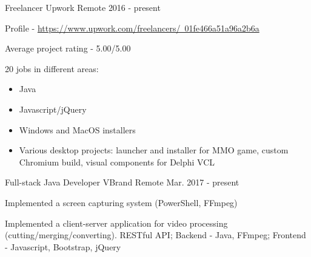 \begin{cventries}
  \cventry
    {Freelancer} %
    {Upwork} %
    {Remote} %
    {2016 - present} %
    {
      \begin{cvitems} %
        \item {Profile - \href{https://www.upwork.com/freelancers/~01fe466a51a96a2b6a}{https://www.upwork.com/freelancers/~01fe466a51a96a2b6a}}
        \item {Average project rating - 5.00/5.00}
        \item {
        	20 jobs in different areas:
            \begin{itemize}
				\item Java
				\item Javascript/jQuery
				\item Windows and MacOS installers
            	\item Various desktop projects: launcher and installer for MMO game, custom Chromium build, visual components for Delphi VCL
			\end{itemize}
        }
      \end{cvitems}
    }

  \cventry
    {Full-stack Java Developer} %
    {VBrand} %
    {Remote} %
    {Mar. 2017 - present} %
    {
      \begin{cvitems} %
        \item Implemented a screen capturing system (PowerShell, FFmpeg)
		\item Implemented a client-server application for video processing (cutting/merging/converting). RESTful API; Backend - Java, FFmpeg; Frontend - Javascript, Bootstrap, jQuery
      \end{cvitems}
    }

\end{cventries}
